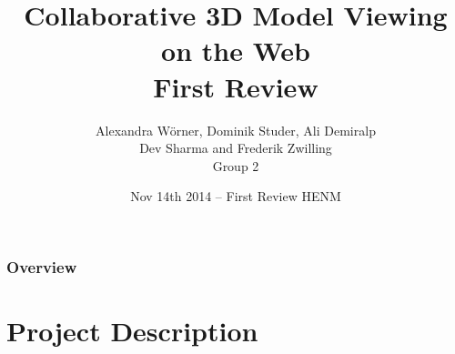 

\title[Collaborative 3D Model Viewing on the Web]{Collaborative 3D Model Viewing on the Web\\ First Review}
\author[Group 2]{%
  Alexandra Wörner, Dominik Studer, Ali Demiralp\\ Dev Sharma and Frederik Zwilling \\
  \bigskip
  {\scriptsize Group 2}
}

\date[Nov 14th 2014 @ HENM 2014]{Nov 14th 2014 -- First Review HENM}



\frame[plain]{\titlepage}
\addtocounter{framenumber}{-1}

\begin{frame}
  \frametitle{Overview}
  \tableofcontents[hideallsubsections]
\end{frame}

\section{Project Description}

